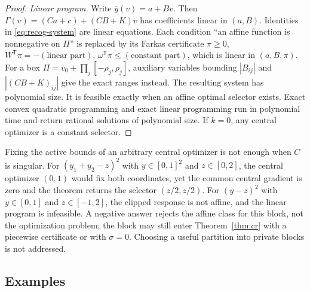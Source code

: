 \begin{proof}
\emph{Linear program.} Write $\bar y(v)=a+Bv$. Then
$\Gamma(v)=(Ca+c)+(CB+K)v$ has coefficients linear in $(a,B)$. Identities in
\eqref{eq:recog-system} are linear equations. Each condition ``an affine
function is nonnegative on $\Pi$'' is replaced by its Farkas certificate
$\pi\ge0$, $W^{\mathsf T}\pi=-(\text{linear part})$,
$\omega^{\mathsf T}\pi\le(\text{constant part})$, which is linear in $(a,B,\pi)$.
For a box $\Pi=v_0+\prod_j[-\rho_j,\rho_j]$, auxiliary variables bounding
$|B_{ij}|$ and $|(CB+K)_{ij}|$ give the exact ranges instead. The resulting
system has polynomial size. It is feasible exactly when an affine optimal
selector exists. Exact convex quadratic programming
\cite{KozlovTarasovKhachiyan1980} and exact linear programming
\cite{GrotschelLovaszSchrijver1988} run in polynomial time and return rational
solutions of polynomial size. If $k=0$, any central optimizer is a constant
selector.
\end{proof}

Fixing the active bounds of an arbitrary central optimizer is not enough when
$C$ is singular. For $(y_1+y_2-z)^2$ with $y\in[0,1]^2$ and $z\in[0,2]$, the
central optimizer $(0,1)$ would fix both coordinates, yet the common central
gradient is zero and the theorem returns the selector $(z/2,z/2)$. For
$(y-z)^2$ with $y\in[0,1]$ and $z\in[-1,2]$, the clipped response is not
affine, and the linear program is infeasible. A negative answer rejects the
affine class for this block, not the optimization problem; the block may
still enter Theorem~\ref{thm:cr} with a piecewise certificate or with
$\sigma=0$. Choosing a useful partition into private blocks is not addressed.

\subsection{Examples}


